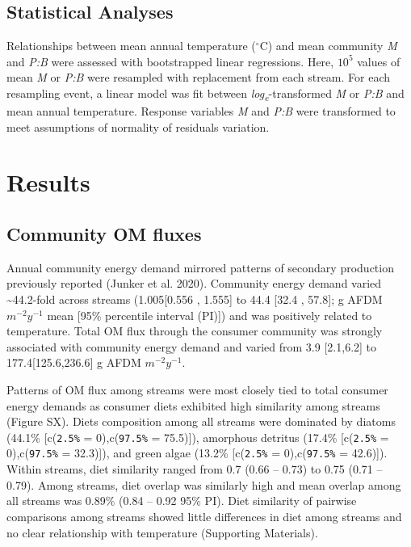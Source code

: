 \documentclass[
]{article}
\begin{document}
\hypertarget{statistical-analyses}{%
\subsection{Statistical Analyses}\label{statistical-analyses}}

Relationships between mean annual temperature (\(^\circ\)C) and mean
community \emph{M} and \emph{P:B} were assessed with bootstrapped linear
regressions. Here, \ensuremath{10^{5}} values of mean \emph{M} or
\emph{P:B} were resampled with replacement from each stream. For each
resampling event, a linear model was fit between
\emph{log\textsubscript{e}}-transformed \emph{M} or \emph{P:B} and mean
annual temperature. Response variables \emph{M} and \emph{P:B} were
transformed to meet assumptions of normality of residuals variation.

\hypertarget{results}{%
\section{Results}\label{results}}

\hypertarget{community-om-fluxes}{%
\subsection{Community OM fluxes}\label{community-om-fluxes}}

Annual community energy demand mirrored patterns of secondary production
previously reported (Junker et al. 2020). Community energy demand varied
\textasciitilde44.2-fold across streams (1.005{[}0.556 , 1.555{]} to
44.4 {[}32.4 , 57.8{]}; g AFDM \(m^{-2} y^{-1}\) mean {[}95\% percentile
interval (PI){]}) and was positively related to temperature. Total OM
flux through the consumer community was strongly associated with
community energy demand and varied from 3.9 {[}2.1,6.2{]} to
177.4{[}125.6,236.6{]} g AFDM \(m^{-2} y^{-1}\).

Patterns of OM flux among streams were most closely tied to total
consumer energy demands as consumer diets exhibited high similarity
among streams (Figure SX). Diets composition among all streams were
dominated by diatoms (44.1\% {[}c(\texttt{2.5\%} = 0),c(\texttt{97.5\%}
= 75.5){]}), amorphous detritus (17.4\% {[}c(\texttt{2.5\%} =
0),c(\texttt{97.5\%} = 32.3){]}), and green algae (13.2\%
{[}c(\texttt{2.5\%} = 0),c(\texttt{97.5\%} = 42.6){]}). Within streams,
diet similarity ranged from 0.7 (0.66 -- 0.73) to 0.75 (0.71 -- 0.79).
Among streams, diet overlap was similarly high and mean overlap among
all streams was 0.89\% (0.84 -- 0.92 95\% PI). Diet similarity of
pairwise comparisons among streams showed little differences in diet
among streams and no clear relationship with temperature (Supporting
Materials).
\end{document}
